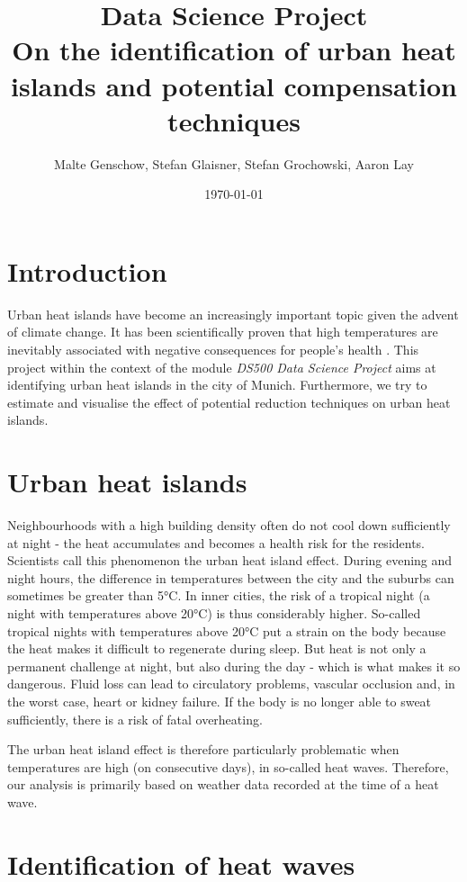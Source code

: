 \documentclass[12pt]{article}
\title{\vspace{-2cm} Data Science Project \\ On the identification of urban heat islands and potential compensation techniques}
\author{Malte Genschow, Stefan Glaisner, Stefan Grochowski, Aaron Lay}
\date{\today}
\begin{document}
\maketitle

\section{Introduction}

Urban heat islands have become an increasingly important topic given the advent of climate change. It has been scientifically proven that high temperatures are inevitably associated with negative consequences for people's health \citep{anderson2009,basu2002,basu2009}. This project within the context of the module \emph{DS500 Data Science Project} aims at identifying urban heat islands in the city of Munich. Furthermore, we try to estimate and visualise the effect of potential reduction techniques on urban heat islands.

\section{Urban heat islands}

Neighbourhoods with a high building density often do not cool down sufficiently at night - the heat accumulates and becomes a health risk for the residents. Scientists call this phenomenon the urban heat island effect. During evening and night hours, the difference in temperatures between the city and the suburbs can sometimes be greater than 5°C. In inner cities, the risk of a tropical night (a night with temperatures above 20°C) is thus considerably higher. So-called tropical nights with temperatures above 20°C put a strain on the body because the heat makes it difficult to regenerate during sleep. But heat is not only a permanent challenge at night, but also during the day - which is what makes it so dangerous. Fluid loss can lead to circulatory problems, vascular occlusion and, in the worst case, heart or kidney failure. If the body is no longer able to sweat sufficiently, there is a risk of fatal overheating.

The urban heat island effect is therefore particularly problematic when temperatures are high (on consecutive days), in so-called heat waves. Therefore, our analysis is primarily based on weather data recorded at the time of a heat wave.

\section{Identification of heat waves}
\end{document}
